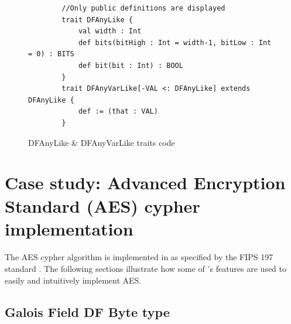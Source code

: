 \begin{figure}[t]
	\centering
	\begin{verbatim}
		//Only public definitions are displayed
		trait DFAnyLike { 
			val width : Int
			def bits(bitHigh : Int = width-1, bitLow : Int = 0) : BITS
			def bit(bit : Int) : BOOL
		}
		trait DFAnyVarLike[-VAL <: DFAnyLike] extends DFAnyLike {
			def := (that : VAL)
		}
	\end{verbatim}
	\caption{DFAnyLike \& DFAnyVarLike traits code}\label{fig:DF father traits}
\end{figure}

%



\section{Case study: Advanced Encryption Standard (AES) cypher implementation}
\paragraph{}The AES cypher algorithm is implemented in \cf as specified by the FIPS 197 standard \cite{daemen2001advanced}. The following sections illustrate how some of \cfns's features are used to easily and intuitively implement AES. 

\subsection*{Galois Field DF Byte type}
